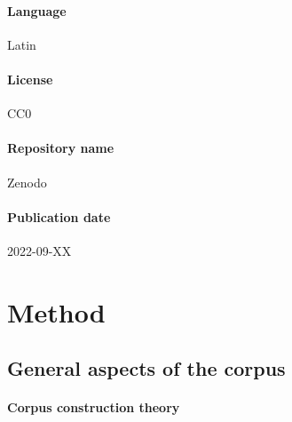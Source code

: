 \documentclass{article}
\begin{document}
\paragraph{Language} Latin
\paragraph{License} CC0
\paragraph{Repository name} Zenodo
\paragraph{Publication date} 2022-09-XX

\section{Method}

\subsection{General aspects of the corpus}

\paragraph{Corpus construction theory}
\end{document}
